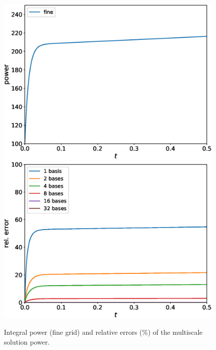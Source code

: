 \documentclass[preprint]{elsarticle}
\begin{document}
\begin{figure}[ht]
	\centering
		\includegraphics[width=0.45\linewidth]{twigl/power_fine.eps} \hspace{2em}
		\includegraphics[width=0.45\linewidth]{twigl/power_error.eps}
	\caption{Integral power (fine grid) and relative errors ($\%$) of the multiscale solution power.}
	\label{twigl_power}
\end{figure}
\end{document}
